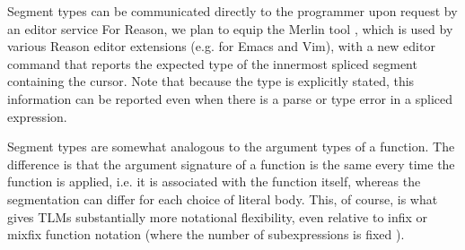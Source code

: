 \documentclass[acmsmall,screen]{acmart}
\begin{document}
Segment types can be communicated directly to the programmer upon request by an editor service For Reason, we plan to equip the {Merlin} tool \cite{Merlin}, which is used by various Reason editor extensions (e.g. for Emacs and Vim), with a new editor command that reports the expected type of the innermost spliced segment containing the cursor. Note that because the type is explicitly stated, this information can be reported even when there is a parse or type error in a spliced expression. %

Segment types are somewhat analogous to the argument types of a function. The difference is that the argument signature of a function is the same every time the function is applied, i.e. it is associated with the function itself, whereas the segmentation can differ for each choice of literal body. This, of course, is what gives TLMs substantially more notational flexibility, even relative to infix or mixfix function notation (where the number of subexpressions is fixed \cite{wieland2009parsing}).%
\end{document}
